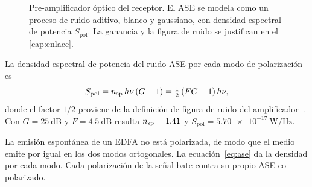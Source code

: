 \begin{figure}[H]
  \centering
  \caption[Modelo del pre-amplificador EDFA]{%
    Pre-amplificador \'optico del receptor. El ASE se modela como un proceso
    de ruido aditivo, blanco y gaussiano, con densidad espectral de potencia
    $S_{\mathrm{pol}}$. La ganancia y la figura de ruido se justifican en el
    \cref{cap:enlace}.}
  \label{fig:edfa}
\end{figure}

La densidad espectral de potencia del ruido ASE por cada modo de
polarizaci\'on es~\cite{mello2021}
\begin{equation}
  S_{\mathrm{pol}} = n_{\mathrm{sp}}\,h\nu\,(G-1) = \tfrac{1}{2}\left(F G - 1\right) h\nu ,
  \label{eq:ase}
\end{equation}
donde el factor $1/2$ proviene de la definici\'on de figura de ruido del
amplificador~\cite{agrawal2010}. Con $G=\SI{25}{\dB}$ y $F=\SI{4.5}{\dB}$
resulta $n_{\mathrm{sp}} = \num{1.41}$ y
$S_{\mathrm{pol}} = \SI{5.70e-17}{\watt\per\hertz}$.

La emisi\'on espont\'anea de un EDFA no est\'a polarizada, de modo que el
medio emite por igual en los dos modos ortogonales. La
ecuaci\'on~\eqref{eq:ase} da la densidad por cada modo. Cada polarizaci\'on de
la se\~nal bate contra su propio ASE co-polarizado.

